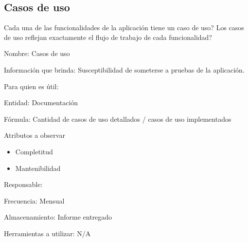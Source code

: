 \subsection{Casos de uso}

 {
    \pregunta Cada una de las funcionalidades de la aplicación tiene un caso de uso?
    \pregunta Los casos de uso reflejan exactamente el flujo de trabajo de cada funcionalidad?
} {
     {
        \item Nombre: Casos de uso
        \item Información que brinda: Susceptibilidad de someterse a pruebas de la aplicación.
        \item Para quien es útil: \pmo
        \item Entidad: Documentación
        \item Fórmula: Cantidad de casos de uso detallados / casos de uso implementados
        \item Atributos a observar
            \begin{itemize}
                \item Completitud
                \item Mantenibilidad
            \end{itemize}
        \item Responsable: \analista
        \item Frecuencia: Mensual
        \item Almacenamiento: Informe entregado
        \item Herramientas a utilizar: N/A
    }
}   

